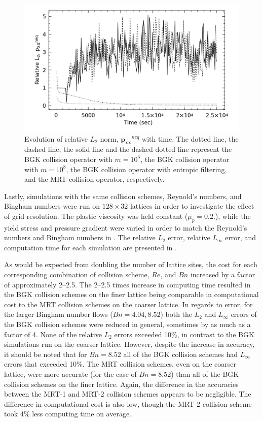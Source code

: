 \begin{figure}
	\centering
	\includegraphics[width=\linewidth]{figs/poise-bingham/pxx}
	\caption{Evolution of relative $L_2$ norm, $\mathbf{p_{xx}}^{neq}$ with time. The dotted line, the dashed line, the solid line and the dashed dotted line represent the BGK collision operator with $m = 10^5$, the BGK collision operator with $m = 10^8$, the BGK collision operator with entropic filtering, and the MRT collision operator, respectively.}
	\label{fig:pxx}
\end{figure}

Lastly, simulations with the same collision schemes, Reynold's numbers, and Bingham numbers were run on $128 \times 32$ lattices in order to investigate the effect of grid resolution.
The plastic viscosity was held constant ($\mu_p = 0.2$.), while the yield stress and pressure gradient were varied in order to match the Reynold's numbers and Bingham numbers in .
The relative $L_2$ error, relative $L_{\infty}$ error, and computation time for each simulation are presented in .

As would be expected from doubling the number of lattice sites, the cost for each corresponding combination of collision scheme, $Re$, and $Bn$ increased by a factor of approximately 2--2.5.
The 2--2.5 times increase in computing time resulted in the BGK collision schemes on the finer lattice being comparable in computational cost to the MRT collision schemes on the coarser lattice.
In regards to error, for the larger Bingham number flows ($Bn = 4.04, 8.52$) both the $L_2$ and $L_\infty$ errors of the BGK collision schemes were reduced in general, sometimes by as much as a factor of 4.
None of the relative $L_2$ errors exceeded 10\%, in contrast to the BGK simulations run on the coarser lattice.
However, despite the increase in accuracy, it should be noted that for $Bn = 8.52$ all of the BGK collision schemes had $L_\infty$ errors that exceeded 10\%.
The MRT collision schemes, even on the coarser lattice, were more accurate (for the case of $Bn = 8.52$) than all of the BGK collision schemes on the finer lattice.
Again, the difference in the accuracies between the MRT-1 and MRT-2 collision schemes appears to be negligible.
The difference in computational cost is also low, though the MRT-2 collision scheme took 4\% less computing time on average.

